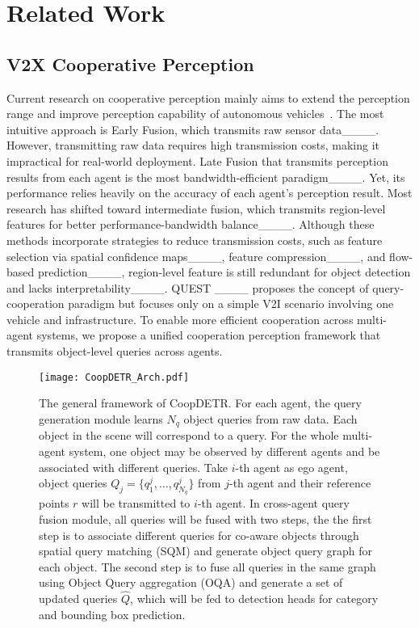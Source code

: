 \section{Related Work}
\subsection{V2X Cooperative Perception}

Current research on cooperative perception mainly aims to extend the perception range and improve perception capability of autonomous vehicles~\cite {wang2024emiff,han2023collaborative}. The most intuitive approach is Early Fusion, which transmits raw sensor data____. However, transmitting raw data requires high transmission costs, making it impractical for real-world deployment. Late Fusion that transmits perception results from each agent is the most bandwidth-efficient paradigm____. Yet, its performance relies heavily on the accuracy of each agent's perception result. Most research has shifted toward intermediate fusion, which transmits region-level features for better performance-bandwidth balance____. Although these methods incorporate strategies to reduce transmission costs, such as feature selection via spatial confidence maps____, feature compression____, and flow-based prediction____, region-level feature is still redundant for object detection and lacks interpretability____. QUEST ____ proposes the concept of query-cooperation paradigm but focuses only on a simple V2I scenario involving one vehicle and infrastructure.  To enable more efficient cooperation across multi-agent systems, we propose a unified cooperation perception framework that transmits object-level queries across agents.


\begin{figure*}[t]
	\centering  
	\texttt{[image: CoopDETR\_Arch.pdf]} 
	\caption{The general framework of CoopDETR. For each agent, the query generation module learns $N_q$ object queries from raw data. Each object in the scene will correspond to a query. For the whole multi-agent system, one object may be observed by different agents and be associated with different queries. Take $i$-th agent as ego agent, object queries $Q_{j} = \{q^{j}_{1},\dots,q^{j}_{N_q}\}$ from $j$-th agent and their reference points $r$ will be transmitted to $i$-th agent. In cross-agent query fusion module, all queries will be fused with two steps, the 
 the first step is to associate different queries for co-aware objects through spatial query matching (SQM) and generate object query graph for each object. The second step is to fuse all queries in the same graph using Object Query aggregation (OQA) and generate a set of updated queries $\hat{Q}$, which will be fed to detection heads for category and bounding box prediction. }  
	\label{fig:framework}   
\end{figure*}

